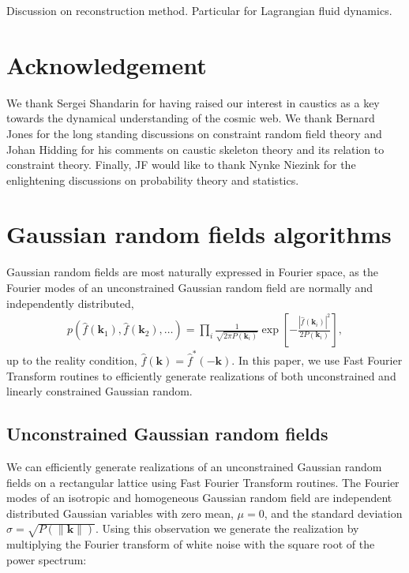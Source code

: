 \documentclass[a4paper, 11pt]{article}
\begin{document}
\begin{framed}
Discussion on reconstruction method. Particular for Lagrangian fluid dynamics.
\end{framed}

\section*{Acknowledgement}
We thank Sergei Shandarin for having raised our interest in caustics as a key towards the dynamical understanding of the cosmic web. We thank Bernard Jones for the long standing discussions on constraint random field theory and Johan Hidding for his comments on caustic skeleton theory and its relation to constraint theory. Finally, JF would like to thank Nynke Niezink for the enlightening discussions on probability theory and statistics. 


%




\appendix
\section{Gaussian random fields algorithms}\label{ap:GRF}
Gaussian random fields are most naturally expressed in Fourier space, as the Fourier modes of an unconstrained Gaussian random field are normally and independently distributed, 
\begin{align}
p(\hat{f}(\bm{k}_1), \hat{f}(\bm{k}_2), \dots) = \prod_{i} \frac{1}{\sqrt{2\pi P(\bm{k}_i)}} \exp\left[-\frac{|\hat{f}(\bm{k}_i)|^2}{2P(\bm{k}_i)}\right],
\end{align}
up to the reality condition, $\hat{f}(\bm{k})=\hat{f}^*(-\bm{k})$. In this paper, we use Fast Fourier Transform routines to efficiently generate realizations of both unconstrained and linearly constrained Gaussian random.

\subsection{Unconstrained Gaussian random fields}
We can efficiently generate realizations of an unconstrained Gaussian random fields on a rectangular lattice using Fast Fourier Transform routines. The Fourier modes of an isotropic and homogeneous Gaussian random field are independent distributed Gaussian variables with zero mean, $\mu=0$, and the standard deviation $\sigma = \sqrt{P(\|\bm{k}\|)}$. Using this observation we generate the realization by multiplying the Fourier transform of white noise with the square root of the power spectrum:\\
\end{document}
